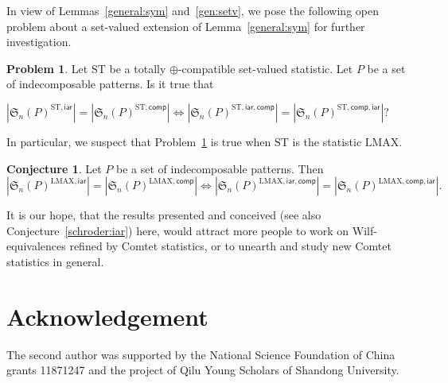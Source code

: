 \documentclass[12pt]{amsart}
\numberwithin{equation}{section}
\theoremstyle{plain}
\theoremstyle{definition}
\newtheorem{conj}[theorem]{Conjecture}
\newtheorem{?}[theorem]{Problem}
\def\S{\mathfrak{S}}
\def\iar{\mathsf{iar}}
\def\comp{\mathsf{comp}}
\def\LMAX{\mathrm{LMAX}}
\def\ST{\mathrm{ST}}
\begin{document}
In view of Lemmas~\ref{general:sym} and~\ref{gen:setv}, we pose the following open problem about a set-valued extension of Lemma~\ref{general:sym} for further investigation. 
\begin{?}\label{open:pro}
Let $\ST$ be a totally $\oplus$-compatible set-valued statistic. Let $P$ be a set of indecomposable patterns. Is it true that 
\begin{center} 
$|\S_n(P)^{\ST,\iar}|=|\S_n(P)^{\ST,\comp}|\Longleftrightarrow|\S_n(P)^{\ST,\iar,\comp}|=|\S_n(P)^{\ST,\comp,\iar}|$?
\end{center}
\end{?}
In particular, we suspect that Problem~\ref{open:pro} is true when $\ST$ is the statistic $\LMAX$. 
\begin{conj}
Let $P$ be a set of indecomposable patterns. Then
$$|\S_n(P)^{\LMAX,\iar}|=|\S_n(P)^{\LMAX,\comp}|\Longleftrightarrow|\S_n(P)^{\LMAX,\iar,\comp}|=|\S_n(P)^{\LMAX,\comp,\iar}|.
$$
\end{conj}

It is our hope, that the results presented and conceived (see also Conjecture~\ref{schroder:iar}) here, would attract more people to work on Wilf-equivalences refined by Comtet statistics, or to unearth and study new Comtet statistics in general.


\section*{Acknowledgement}


The second author was supported
by the National Science Foundation of China grants 11871247 and the project of Qilu Young Scholars of Shandong University.
\end{document}
